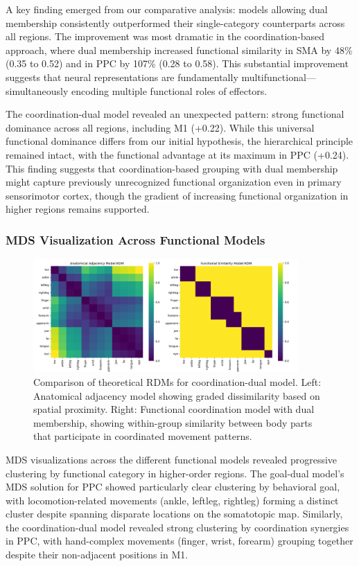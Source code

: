 \documentclass{article}
\begin{document}
A key finding emerged from our comparative analysis: models allowing dual membership consistently outperformed their single-category counterparts across all regions. The improvement was most dramatic in the coordination-based approach, where dual membership increased functional similarity in SMA by 48\% (0.35 to 0.52) and in PPC by 107\% (0.28 to 0.58). This substantial improvement suggests that neural representations are fundamentally multifunctional—simultaneously encoding multiple functional roles of effectors.

The coordination-dual model revealed an unexpected pattern: strong functional dominance across all regions, including M1 (+0.22). While this universal functional dominance differs from our initial hypothesis, the hierarchical principle remained intact, with the functional advantage at its maximum in PPC (+0.24). This finding suggests that coordination-based grouping with dual membership might capture previously unrecognized functional organization even in primary sensorimotor cortex, though the gradient of increasing functional organization in higher regions remains supported.

\subsubsection{MDS Visualization Across Functional Models}

\begin{figure}[!htbp]
\centering
\includegraphics[width=0.9\textwidth]{results/coordination_dual/theoretical_rdms.png}
\caption{Comparison of theoretical RDMs for coordination-dual model. Left: Anatomical adjacency model showing graded dissimilarity based on spatial proximity. Right: Functional coordination model with dual membership, showing within-group similarity between body parts that participate in coordinated movement patterns.}
\label{fig:mds_comparison}
\end{figure}

MDS visualizations across the different functional models revealed progressive clustering by functional category in higher-order regions. The goal-dual model's MDS solution for PPC showed particularly clear clustering by behavioral goal, with locomotion-related movements (ankle, leftleg, rightleg) forming a distinct cluster despite spanning disparate locations on the somatotopic map. Similarly, the coordination-dual model revealed strong clustering by coordination synergies in PPC, with hand-complex movements (finger, wrist, forearm) grouping together despite their non-adjacent positions in M1.
\end{document}
